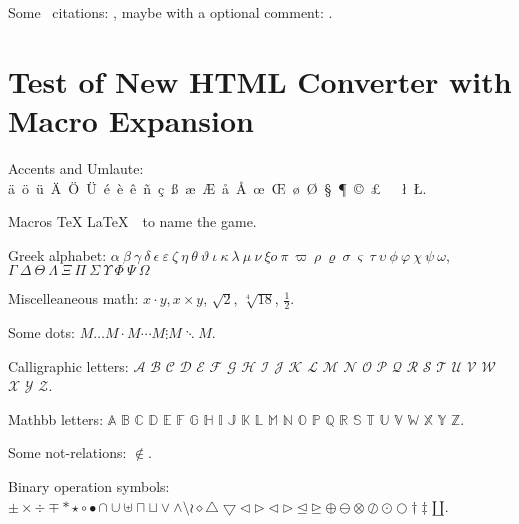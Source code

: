 \documentclass[12pt]{article}
\begin{document}
{Some \cgal\ citations: \cite{fgkss-ckbgc-96,kw-ceapp-97}, maybe
with a optional comment: \cite[optional comment]{fgkss-ckbgc-96,kw-ceapp-97}.

\section{Test of New HTML Converter with Macro Expansion}

Accents and Umlaute: \"a\ \"o\ \"u\ \"A\ \"O\ \"{U}\ \'e\ \`e\ \^e\ 
  \~n\ \c{c}\ \ss{}\ \ae\ \AE\ \aa\ \AA\ \oe\ \OE\ \o\ \O\ \S\ 
  \P\ \copyright\ \pounds\ \dag\ \ddag\ \l\ \L.


Macros \TeX{} \LaTeX\ \LaTeXe\ to name the game.

Greek alphabet: $\alpha\ \beta\ \gamma\ \delta\ \epsilon\ 
    \varepsilon\ \zeta\ \eta\ \theta\ \vartheta\ \iota\ \kappa\ \lambda\
    \mu\ \nu\ \xi o\ \pi\ \varpi\ \rho\ \varrho\ \sigma\ \varsigma\ 
    \tau\ \upsilon\ \phi\ \varphi\ \chi\ \psi\ \omega$,  
    $\Gamma\ \Delta\ \Theta\ \Lambda\ \Xi\ \Pi\ \Sigma\ \Upsilon\ \Phi\ 
    \Psi\ \Omega$

Miscelleaneous math: $x \cdot y, x \times y$, $\sqrt{2}$, $\sqrt[4]{18}$,
    $\frac{1}{2}$.

Some dots: $M \ldots M \cdot M \cdots M \vdots M \ddots M$.

Calligraphic letters: $\mathcal{A}$ $\mathcal{B}$ $\mathcal{C}$ $\mathcal{D}$
 $\mathcal{E}$ $\mathcal{F}$ $\mathcal{G}$ $\mathcal{H}$ $\mathcal{I}$
 $\mathcal{J}$ $\mathcal{K}$ $\mathcal{L}$ $\mathcal{M}$ $\mathcal{N}$
 $\mathcal{O}$ $\mathcal{P}$ $\mathcal{Q}$ $\mathcal{R}$ $\mathcal{S}$
 $\mathcal{T}$ $\mathcal{U}$ $\mathcal{V}$ $\mathcal{W}$ $\mathcal{X}$
 $\mathcal{Y}$ $\mathcal{Z}$.

Mathbb letters: $\mathbb{A}$ $\mathbb{B}$ $\mathbb{C}$ $\mathbb{D}$
 $\mathbb{E}$ $\mathbb{F}$ $\mathbb{G}$ $\mathbb{H}$ $\mathbb{I}$
 $\mathbb{J}$ $\mathbb{K}$ $\mathbb{L}$ $\mathbb{M}$ $\mathbb{N}$
 $\mathbb{O}$ $\mathbb{P}$ $\mathbb{Q}$ $\mathbb{R}$ $\mathbb{S}$
 $\mathbb{T}$ $\mathbb{U}$ $\mathbb{V}$ $\mathbb{W}$ $\mathbb{X}$
 $\mathbb{Y}$ $\mathbb{Z}$.

Some not-relations: $ \not\in $.

Binary operation symbols: $ \pm \times \div \mp \ast \star \circ \bullet
 \cap \cup \uplus \sqcap \sqcup \vee \wedge \setminus \wr \diamond
 \bigtriangleup \bigtriangledown \triangleleft \triangleright \lhd
 \rhd \unlhd \unrhd \oplus \ominus \otimes \oslash \odot \bigcirc \dagger
 \ddagger \amalg$.

}
\end{document}
